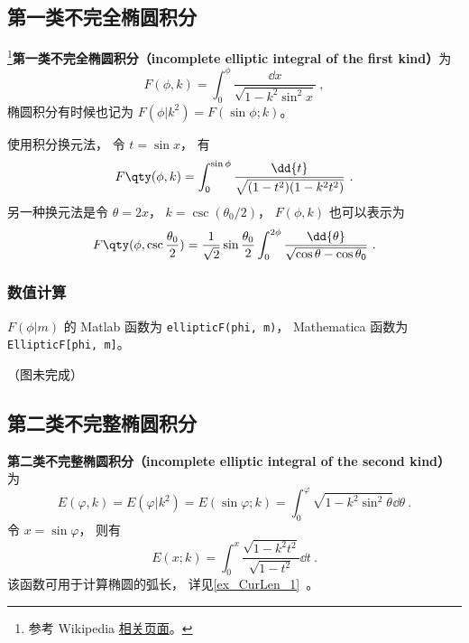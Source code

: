 

\subsection{第一类不完全椭圆积分}
\footnote{参考 Wikipedia \href{https://en.wikipedia.org/wiki/Elliptic_integral}{相关页面}。}\textbf{第一类不完全椭圆积分（incomplete elliptic integral of the first kind）}为
\begin{equation}\label{eq_EliInt_1}
F(\phi, k) = \int_0^\phi \frac{\dd{x}}{\sqrt{1 - k^2\sin^2 x}}~,
\end{equation}
椭圆积分有时候也记为 $F(\phi | k^2) = F(\sin\phi ; k)$。

使用积分换元法， 令 $t = \sin x$， 有
\begin{equation}
F\qty(\phi, k) = \int_0^{\sin{\phi}} \frac{\dd{t}}{\sqrt{(1 - t^2)(1 - k^2 t^2)}}~.
\end{equation}
另一种换元法是令 $\theta = 2x$， $k = \csc(\theta_0/2)$， $F(\phi, k)$ 也可以表示为
\begin{equation}\label{eq_EliInt_2}
F\qty(\phi, \csc\frac{\theta_0}{2}) = \frac{1}{\sqrt{2}} \sin\frac{\theta_0}{2} \int_0^{2\phi} \frac{\dd{\theta}}{\sqrt{\cos\theta - \cos\theta_0}}~.
\end{equation}

\subsubsection{数值计算}
$F(\phi | m)$ 的 Matlab 函数为 \verb|ellipticF(phi, m)|， %
Mathematica 函数为 \verb|EllipticF[phi, m]|。

（图未完成）

\subsection{第二类不完整椭圆积分}
\textbf{第二类不完整椭圆积分（incomplete elliptic integral of the second kind）}为
\begin{equation}\label{eq_EliInt_3}
E(\varphi, k) = E(\varphi | k^2) = E(\sin\varphi; k) = \int_0^\varphi \sqrt{1 - k^2\sin^2\theta} \dd{\theta}~.
\end{equation}
令 $x = \sin\varphi$， 则有
\begin{equation}
E(x; k) = \int_0^x \frac{\sqrt{1 - k^2t^2}}{\sqrt{1 - t^2}}\dd{t}~.
\end{equation}
该函数可用于计算椭圆的弧长， 详见\autoref{ex_CurLen_1}~。

